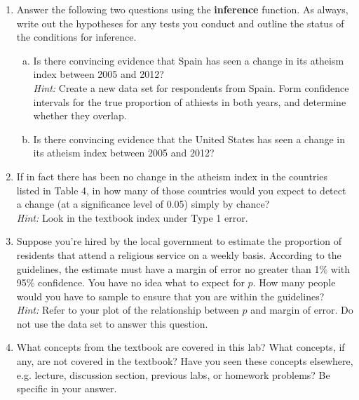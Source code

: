 \documentclass{article}\usepackage[]{graphicx}\usepackage[]{color}
\newcommand{\hlkwd}[1]{\textcolor[rgb]{0.737,0.353,0.396}{\textbf{#1}}}%
\begin{document}
\begin{enumerate}
\item Answer the following two questions using the \hlkwd{inference} function. As always, write out the hypotheses for any tests you conduct and outline the status of the conditions for inference.
\begin{enumerate}[(a)]
\item Is there convincing evidence that Spain has seen a change in its atheism index between 2005 and 2012? \\
\textit{Hint:} Create a new data set for respondents from Spain. Form confidence intervals for the true proportion of athiests in both years, and determine whether they overlap. 
\item Is there convincing evidence that the United States has seen a change in its atheism index between 2005 and 2012?
\end{enumerate}

\item If in fact there has been no change in the atheism index in the countries listed in Table 4, in how many of those countries would you expect to detect a change (at a significance level of 0.05) simply by chance? \\
\textit{Hint:} Look in the textbook index under Type 1 error.

\item Suppose you're hired by the local government to estimate the proportion of residents that attend a religious service on a weekly basis. According to the guidelines, the estimate must have a margin of error no greater than 1\% with 95\% confidence. You have no idea what to expect for $p$. How many people would you have to sample to ensure that you are within the guidelines?\\
\textit{Hint:} Refer to your plot of the relationship between $p$ and margin of error. Do not use the data set to answer this question.

\item What concepts from the textbook are covered in this lab? What concepts, if any, are not covered in the textbook? Have you seen these concepts elsewhere, e.g. lecture, discussion section, previous labs, or homework problems? Be specific in your answer.
\end{enumerate}
\end{document}
